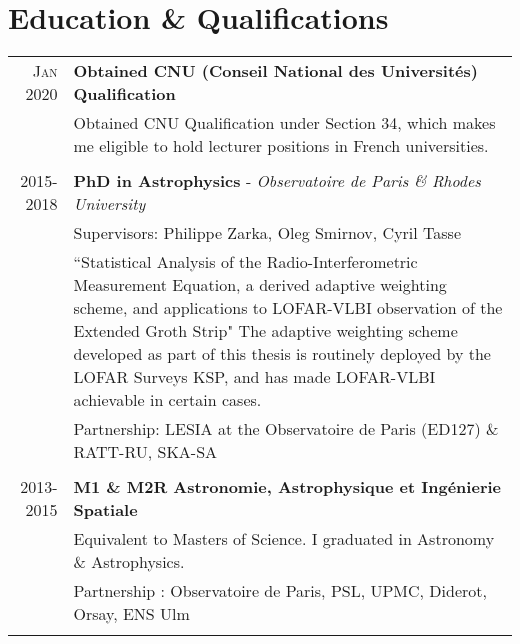\documentclass[10pt]{article} %
\begin{document}

\section{Education \& Qualifications}

\begin{tabular}{r|p{12.5cm}}
	\textsc{Jan 2020} & \textbf{Obtained CNU (Conseil National des Universités)  Qualification}\\
	& Obtained CNU Qualification under Section 34, which makes me eligible to hold lecturer positions in French universities.\\
	\multicolumn{2}{c}{} \\

\textsc{2015-2018} & \textbf{PhD in Astrophysics} - \textit{Observatoire de Paris \& Rhodes University}\\
& Supervisors: Philippe Zarka, Oleg Smirnov, Cyril Tasse\\
& ``Statistical Analysis of the Radio-Interferometric Measurement Equation,
a derived adaptive weighting scheme, and applications to LOFAR-VLBI
observation of the Extended Groth Strip" The adaptive weighting scheme developed as part of this thesis is routinely deployed by the LOFAR Surveys KSP, and has made LOFAR-VLBI achievable in certain cases.\\
& Partnership: LESIA at the Observatoire de Paris (ED127) \& RATT-RU, SKA-SA\\
\multicolumn{2}{c}{} \\

\textsc{2013-2015} & \textbf{M1 \& M2R Astronomie, Astrophysique et Ingénierie Spatiale} \\
& Equivalent to Masters of Science. I graduated in Astronomy \& Astrophysics.\\
& Partnership : Observatoire de Paris, PSL, UPMC, Diderot, Orsay, ENS Ulm\\
\multicolumn{2}{c}{} \\



\end{tabular}
\end{document}
